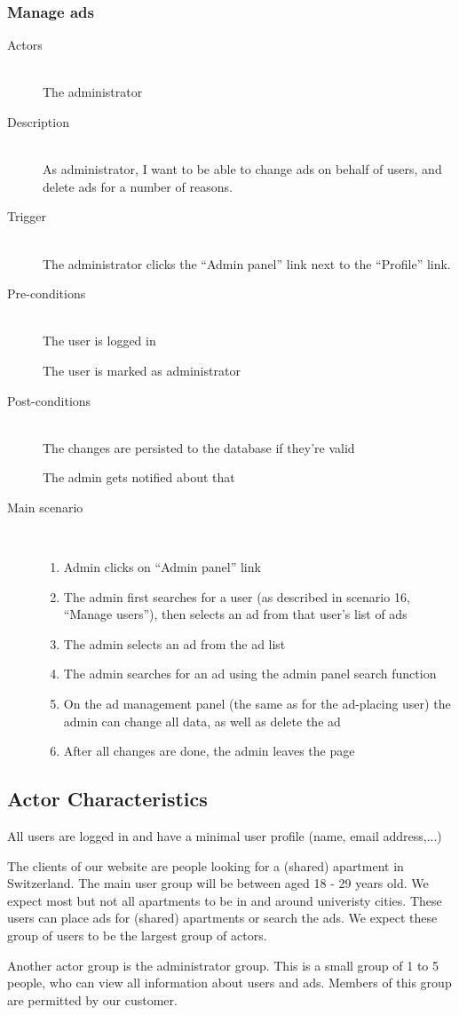 \documentclass[a4wide]{article}
\begin{document}
\subsubsection{Manage ads}
\begin{description}
\item[Actors]\mbox{}\\
The administrator
\item[Description]\mbox{}\\
As administrator, I want to be able to change ads on behalf of users, and delete ads for a number of reasons.
\item[Trigger]\mbox{}\\
The administrator clicks the “Admin panel” link next to the “Profile” link.
\item[Pre-conditions]\mbox{}\\
The user is logged in

The user is marked as administrator
\item[Post-conditions]\mbox{}\\
The changes are persisted to the database if they’re valid

The admin gets notified about that

\item[Main scenario]\mbox{}\\
\begin{enumerate}
\item Admin clicks on “Admin panel” link
\item The admin first searches for a user (as described in scenario 16, “Manage users”), then selects an ad from that user’s list of ads
\item The admin selects an ad from the ad list
\item The admin searches for an ad using the admin panel search function
\item On the ad management panel (the same as for the ad-placing user) the admin can change all data, as well as delete the ad
\item After all changes are done, the admin leaves the page

\end{enumerate}
\end{description}
\subsection{Actor Characteristics}
All users are logged in and have a minimal user profile (name, email address,...)

The clients of our website are people looking for a (shared) apartment in Switzerland.
The main user group will be between aged 18 - 29 years old. 
We expect most but not all apartments to be in and around univeristy cities.
These users can place ads for (shared) apartments or search the ads. 
We expect these group of users to be the largest group of actors.

Another actor group is the administrator group. This is a small group of 1 to 5 people, who can view all information about users and ads. Members of this group are permitted by our customer. 
\end{document}
